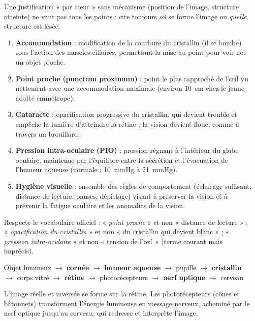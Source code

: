 \documentclass[11pt]{article}
\newcommand{\cle}[1]{{\popxbold\color{popdark}#1}}
\begin{document}
\begin{attention}
Une justification « par cœur » sans mécanisme (position de l'image, structure atteinte) ne vaut pas tous les points : cite toujours \emph{où} se forme l'image ou \emph{quelle} structure est lésée.
\end{attention}

\begin{corrige}
\begin{enumerate}
\item \textbf{Accommodation} : modification de la courbure du cristallin (il se bombe) sous l'action des muscles ciliaires, permettant la mise au point pour voir net un objet proche.
\item \textbf{Point proche (punctum proximum)} : point le plus rapproché de l'œil vu nettement avec une accommodation maximale (environ \SI{10}{cm} chez le jeune adulte emmétrope).
\item \textbf{Cataracte} : opacification progressive du cristallin, qui devient trouble et empêche la lumière d'atteindre la rétine ; la vision devient floue, comme à travers un brouillard.
\item \textbf{Pression intra-oculaire (PIO)} : pression régnant à l'intérieur du globe oculaire, maintenue par l'équilibre entre la sécrétion et l'évacuation de l'humeur aqueuse (normale : \SI{10}{mmHg} à \SI{21}{mmHg}).
\item \textbf{Hygiène visuelle} : ensemble des règles de comportement (éclairage suffisant, distance de lecture, pauses, dépistage) visant à préserver la vision et à prévenir la fatigue oculaire et les anomalies de la vision.
\end{enumerate}
\end{corrige}

\begin{attention}
Respecte le vocabulaire officiel : « \emph{point proche} » et non « distance de lecture » ; « \emph{opacification du cristallin} » et non « du cristallin qui devient blanc » ; « \emph{pression intra-oculaire} » et non « tension de l'œil » (terme courant mais imprécis).
\end{attention}

\begin{corrige}
\begin{center}
Objet lumineux $\rightarrow$ \textbf{cornée} $\rightarrow$ \textbf{humeur aqueuse} $\rightarrow$ pupille $\rightarrow$ \textbf{cristallin} $\rightarrow$ corps vitré $\rightarrow$ \textbf{rétine} $\rightarrow$ photorécepteurs $\rightarrow$ \textbf{nerf optique} $\rightarrow$ cerveau
\end{center}
L'image réelle et inversée se forme sur la \cle{rétine}. Les photorécepteurs (cônes et bâtonnets) transforment l'énergie lumineuse en message nerveux, acheminé par le nerf optique jusqu'au cerveau, qui redresse et interprète l'image.
\end{corrige}
\end{document}
